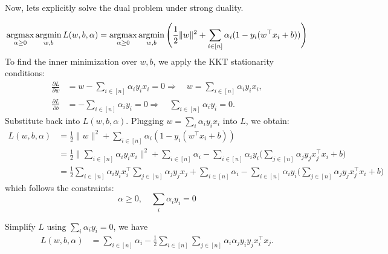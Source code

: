 \documentclass[../main]{subfiles}
\begin{document}
Now, lets explicitly solve the dual problem under strong duality.
\begin{solution}
\begin{equation}
    \mathop{\mathrm{argmax}}_{\alpha \ge 0} \mathop{\mathrm{argmin}}_{w,b} L(w,b,\alpha)
    = \mathop{\mathrm{argmax}}_{\alpha \ge 0} \mathop{\mathrm{argmin}}_{w,b} 
      \Bigg( \frac{1}{2}\|w\|^2 + \sum_{i \in [n]} \alpha_i (1 - y_i (w^\top x_i + b)) \Bigg)
\end{equation}
To find the inner minimization over $w,b$, we apply the KKT stationarity conditions:
\begin{align}
    \frac{\partial L}{\partial w} &= w - \sum_{i \in [n]} \alpha_i y_i x_i = 0
    \Rightarrow\quad w = \sum_{i \in [n]} \alpha_i y_i x_i, \\
    \frac{\partial L}{\partial b} &= -\sum_{i \in [n]} \alpha_i y_i = 0
    \Rightarrow\quad \sum_{i \in [n]} \alpha_i y_i = 0.
\end{align}
{Substitute back into $L(w,b,\alpha)$.}
Plugging $w = \sum_i \alpha_i y_i x_i$ into $L$, we obtain:
\begin{align}
    L(w,b,\alpha)
    &= \frac{1}{2}\|w\|^2 + \sum_{i \in [n]} \alpha_i (1 - y_i(w^\top x_i + b)) \\
    &= \frac{1}{2}
        \Bigg\|
            \sum_{i \in [n]} \alpha_i y_i x_i
        \Bigg\|^2
        + \sum_{i \in [n]} \alpha_i
        - \sum_{i \in [n]} \alpha_i y_i 
            \Bigg(\sum_{j \in [n]} \alpha_j y_j x_j^\top x_i + b\Bigg)\\
            &= \frac{1}{2}
                \sum_{i \in [n]} \alpha_i y_i x_i^\top\sum_{j \in [n]} \alpha_j y_j x_j
            + \sum_{i \in [n]} \alpha_i
            - \sum_{i \in [n]} \alpha_i y_i 
                \Bigg(\sum_{j \in [n]} \alpha_j y_j x_j^\top x_i + b\Bigg)
\end{align}
which follows the constraints:
\begin{equation}
    \alpha\ge 0,\quad \sum_{i}\alpha_i y_i=0
\end{equation}

Simplify $L$ using $\sum_i \alpha_i y_i = 0$, we have
\begin{align}
    L(w,b,\alpha)
    &= \sum_{i \in [n]} \alpha_i
       - \frac{1}{2}
         \sum_{i \in [n]} \sum_{j \in [n]}
         \alpha_i \alpha_j y_i y_j x_i^\top x_j.
         \label{equ:3.50}
\end{align}


\end{solution}
\end{document}
